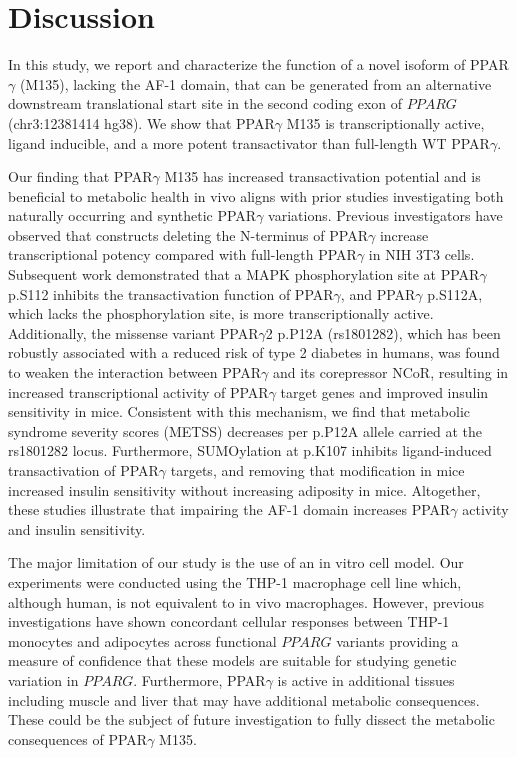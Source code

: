 \section{Discussion}

In this study, we report and characterize the function of a novel isoform of PPAR$\gamma$ (M135), lacking the AF-1 domain, that can be generated from an alternative downstream translational start site in the second coding exon of \(PPARG\) (chr3:12381414 hg38). We show that PPAR$\gamma$ M135 is transcriptionally active, ligand inducible, and a more potent transactivator than full-length WT PPAR$\gamma$.  

Our finding that PPAR$\gamma$ M135 has increased transactivation potential and is beneficial to metabolic health in vivo aligns with prior studies investigating both naturally occurring and synthetic PPAR$\gamma$ variations. Previous investigators have observed that constructs deleting the N-terminus of PPAR$\gamma$ increase transcriptional potency compared with full-length PPAR$\gamma$ in NIH 3T3 cells\cite{Tontonoz1994-ds,Hummasti2006-rm}. Subsequent work demonstrated that a MAPK phosphorylation site at PPAR$\gamma$ p.S112 inhibits the transactivation function of PPAR$\gamma$\cite{Adams1997-cf}, and PPAR$\gamma$ p.S112A, which lacks the phosphorylation site, is more transcriptionally active\cite{Adams1997-cf,Hu1996-mb,Camp1997-nf}. Additionally, the missense variant PPAR$\gamma$2 p.P12A (rs1801282), which has been robustly associated with a reduced risk of type 2 diabetes in humans\cite{Altshuler2000-kl}, was found to weaken the interaction between PPAR$\gamma$ and its corepressor NCoR, resulting in increased transcriptional activity of PPAR$\gamma$ target genes and improved insulin sensitivity in mice\cite{Heikkinen2009-vb}. Consistent with this mechanism, we find that metabolic syndrome severity scores (METSS) decreases per p.P12A allele carried at the rs1801282 locus. Furthermore, SUMOylation at p.K107 inhibits ligand-induced transactivation of PPAR$\gamma$ targets\cite{Pascual2005-ki}, and removing that modification in mice increased insulin sensitivity without increasing adiposity in mice\cite{Katafuchi2018-jw}. Altogether, these studies illustrate that impairing the AF-1 domain increases PPAR$\gamma$ activity and insulin sensitivity. 

The major limitation of our study is the use of an in vitro cell model. Our experiments were conducted using the THP-1 macrophage cell line which, although human, is not equivalent to in vivo macrophages. However, previous investigations have shown concordant cellular responses between THP-1 monocytes and adipocytes across functional \(PPARG\) variants\cite{Majithia2016-bm,Agostini2018-bx,Majithia2014-op} providing a measure of confidence that these models are suitable for studying genetic variation in \(PPARG\). Furthermore, PPAR$\gamma$ is active in additional tissues including muscle and liver that may have additional metabolic consequences\cite{Norris2003-hi,Gavrilova2003-gb}. These could be the subject of future investigation to fully dissect the metabolic consequences of PPAR$\gamma$ M135.


